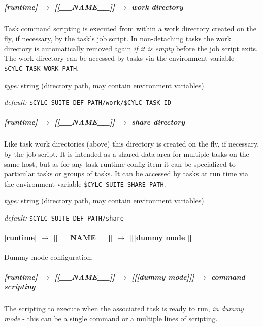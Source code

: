 \subparagraph[work directory]{[runtime] $\rightarrow$ [[\_\_NAME\_\_]] $\rightarrow$ work directory}
\label{LocalWork}

Task command scripting is executed from within a work directory created
on the fly, if necessary, by the task's job script. In non-detaching
tasks the work directory is automatically removed again {\em if it is
empty} before the job script exits. The work directory can be accessed
by tasks via the environment variable \lstinline=$CYLC_TASK_WORK_PATH=.

\begin{myitemize}
\item {\em type:} string (directory path, may contain environment variables)
\item {\em default:} \lstinline=$CYLC_SUITE_DEF_PATH/work/$CYLC_TASK_ID=
\end{myitemize}

\subparagraph[share directory]{[runtime] $\rightarrow$ [[\_\_NAME\_\_]] $\rightarrow$ share directory}
\label{LocalShare}

Like task work directories (above) this directory is created on the fly,
if necessary, by the job script. It is intended as a shared data area
for multiple tasks on the same host, but as for any task runtime config
item it can be specialized to particular tasks or groups of tasks. 
It can be accessed by tasks at run time via the environment variable
\lstinline=$CYLC_SUITE_SHARE_PATH=.

\begin{myitemize}
\item {\em type:} string (directory path, may contain environment variables)
\item {\em default:} \lstinline=$CYLC_SUITE_DEF_PATH/share=
\end{myitemize}

\paragraph[{[[[}dummy mode{]]]}]{[runtime] $\rightarrow$ [[\_\_NAME\_\_]] $\rightarrow$ [[[dummy mode]]]}

Dummy mode configuration.

\subparagraph[command scripting]{[runtime] $\rightarrow$ [[\_\_NAME\_\_]] $\rightarrow$ [[[dummy mode]]] $\rightarrow$ command scripting}

The scripting to execute when the associated task is ready to run, {\em
in dummy mode} - this can be a single command or a multiple lines of
scripting. 

